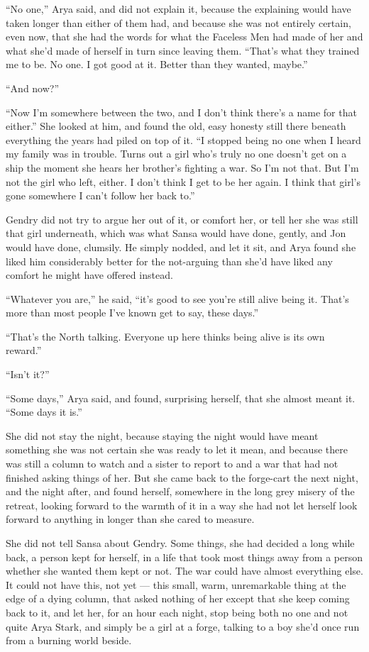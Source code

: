 “No one,” Arya said, and did not explain it, because the explaining would have taken longer than either of them had, and because she was not entirely certain, even now, that she had the words for what the Faceless Men had made of her and what she’d made of herself in turn since leaving them. “That’s what they trained me to be. No one. I got good at it. Better than they wanted, maybe.”

“And now?”

“Now I’m somewhere between the two, and I don’t think there’s a name for that either.” She looked at him, and found the old, easy honesty still there beneath everything the years had piled on top of it. “I stopped being no one when I heard my family was in trouble. Turns out a girl who’s truly no one doesn’t get on a ship the moment she hears her brother’s fighting a war. So I’m not that. But I’m not the girl who left, either. I don’t think I get to be her again. I think that girl’s gone somewhere I can’t follow her back to.”

Gendry did not try to argue her out of it, or comfort her, or tell her she was still that girl underneath, which was what Sansa would have done, gently, and Jon would have done, clumsily. He simply nodded, and let it sit, and Arya found she liked him considerably better for the not-arguing than she’d have liked any comfort he might have offered instead.

“Whatever you are,” he said, “it’s good to see you’re still alive being it. That’s more than most people I’ve known get to say, these days.”

“That’s the North talking. Everyone up here thinks being alive is its own reward.”

“Isn’t it?”

“Some days,” Arya said, and found, surprising herself, that she almost meant it. “Some days it is.”

\sceneBreak

She did not stay the night, because staying the night would have meant something she was not certain she was ready to let it mean, and because there was still a column to watch and a sister to report to and a war that had not finished asking things of her. But she came back to the forge-cart the next night, and the night after, and found herself, somewhere in the long grey misery of the retreat, looking forward to the warmth of it in a way she had not let herself look forward to anything in longer than she cared to measure.

She did not tell Sansa about Gendry. Some things, she had decided a long while back, a person kept for herself, in a life that took most things away from a person whether she wanted them kept or not. The war could have almost everything else. It could not have this, not yet — this small, warm, unremarkable thing at the edge of a dying column, that asked nothing of her except that she keep coming back to it, and let her, for an hour each night, stop being both no one and not quite Arya Stark, and simply be a girl at a forge, talking to a boy she’d once run from a burning world beside.